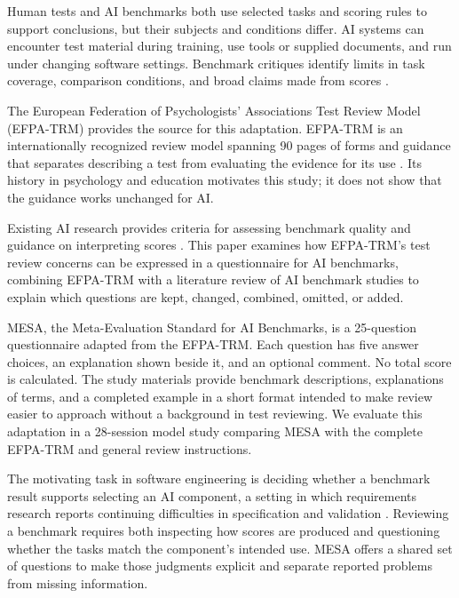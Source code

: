 \documentclass[10pt,conference]{IEEEtran}
\begin{document}
Human tests and AI benchmarks both use selected tasks and scoring rules to support conclusions, but their subjects and conditions differ. AI systems can encounter test material during training, use tools or supplied documents, and run under changing software settings. Benchmark critiques identify limits in task coverage, comparison conditions, and broad claims made from scores \cite{jo_wilson_what_does_your_benchmark_measure,singh_leaderboard_illusion}.

The European Federation of Psychologists' Associations Test Review Model (EFPA-TRM) provides the source for this adaptation. EFPA-TRM is an internationally recognized review model spanning 90 pages of forms and guidance that separates describing a test from evaluating the evidence for its use \cite{efpa_test_review_model_2025}. Its history in psychology and education motivates this study; it does not show that the guidance works unchanged for AI.

Existing AI research provides criteria for assessing benchmark quality and guidance on interpreting scores \cite{reuel_betterbench,bean_measuring_what_matters,jo_wilson_what_does_your_benchmark_measure}. This paper examines how EFPA-TRM's test review concerns can be expressed in a questionnaire for AI benchmarks, combining EFPA-TRM with a literature review of AI benchmark studies to explain which questions are kept, changed, combined, omitted, or added.

MESA, the Meta-Evaluation Standard for AI Benchmarks, is a 25-question questionnaire adapted from the EFPA-TRM. Each question has five answer choices, an explanation shown beside it, and an optional comment. No total score is calculated. The study materials provide benchmark descriptions, explanations of terms, and a completed example in a short format intended to make review easier to approach without a background in test reviewing. We evaluate this adaptation in a 28-session model study comparing MESA with the complete EFPA-TRM and general review instructions.

The motivating task in software engineering is deciding whether a benchmark result supports selecting an AI component, a setting in which requirements research reports continuing difficulties in specification and validation \cite{habiba_re4ai_maturity_2024}. Reviewing a benchmark requires both inspecting how scores are produced and questioning whether the tasks match the component's intended use. MESA offers a shared set of questions to make those judgments explicit and separate reported problems from missing information.
\end{document}
